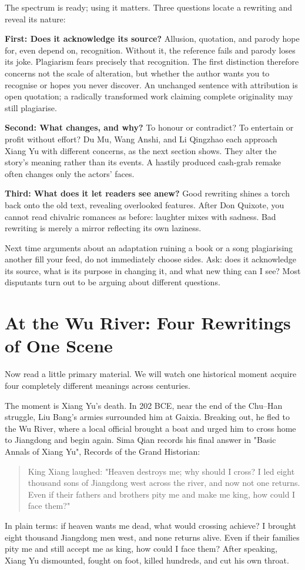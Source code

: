 The spectrum is ready; using it matters. Three questions locate a rewriting and reveal its nature:

\textbf{First: Does it acknowledge its source?} Allusion, quotation, and parody hope for, even depend on, recognition. Without it, the reference fails and parody loses its joke. Plagiarism fears precisely that recognition. The first distinction therefore concerns not the scale of alteration, but whether the author wants you to recognise or hopes you never discover. An unchanged sentence with attribution is open quotation; a radically transformed work claiming complete originality may still plagiarise.

\textbf{Second: What changes, and why?} To honour or contradict? To entertain or profit without effort? Du Mu, Wang Anshi, and Li Qingzhao each approach Xiang Yu with different concerns, as the next section shows. They alter the story's meaning rather than its events. A hastily produced cash-grab remake often changes only the actors' faces.

\textbf{Third: What does it let readers see anew?} Good rewriting shines a torch back onto the old text, revealing overlooked features. After Don Quixote, you cannot read chivalric romances as before: laughter mixes with sadness. Bad rewriting is merely a mirror reflecting its own laziness.

Next time arguments about an adaptation ruining a book or a song plagiarising another fill your feed, do not immediately choose sides. Ask: does it acknowledge its source, what is its purpose in changing it, and what new thing can I see? Most disputants turn out to be arguing about different questions.

\section[At the Wu River: Four Rewritings]{At the Wu River: Four Rewritings of One Scene}
Now read a little primary material. We will watch one historical moment acquire four completely different meanings across centuries.

The moment is Xiang Yu's death. In 202 BCE, near the end of the Chu--Han struggle, Liu Bang's armies surrounded him at Gaixia. Breaking out, he fled to the Wu River, where a local official brought a boat and urged him to cross home to Jiangdong and begin again. Sima Qian records his final answer in "Basic Annals of Xiang Yu", Records of the Grand Historian:

\begin{quote}
King Xiang laughed: "Heaven destroys me; why should I cross? I led eight thousand sons of Jiangdong west across the river, and now not one returns. Even if their fathers and brothers pity me and make me king, how could I face them?"
\end{quote}
In plain terms: if heaven wants me dead, what would crossing achieve? I brought eight thousand Jiangdong men west, and none returns alive. Even if their families pity me and still accept me as king, how could I face them? After speaking, Xiang Yu dismounted, fought on foot, killed hundreds, and cut his own throat.


